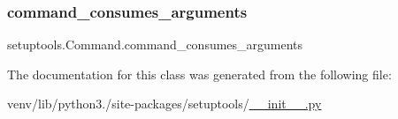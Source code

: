 \subsubsection{\texorpdfstring{command\+\_\+consumes\+\_\+arguments}{command\_consumes\_arguments}}
{\footnotesize\ttfamily setuptools.\+Command.\+command\+\_\+consumes\+\_\+arguments\hspace{0.3cm}{\ttfamily [static]}}



The documentation for this class was generated from the following file\+:\begin{DoxyCompactItemize}
\item 
venv/lib/python3./site-\/packages/setuptools/\hyperlink{venv_2lib_2python3_89_2site-packages_2setuptools_2____init_____8py}{\+\_\+\+\_\+init\+\_\+\+\_\+.\+py}\end{DoxyCompactItemize}
